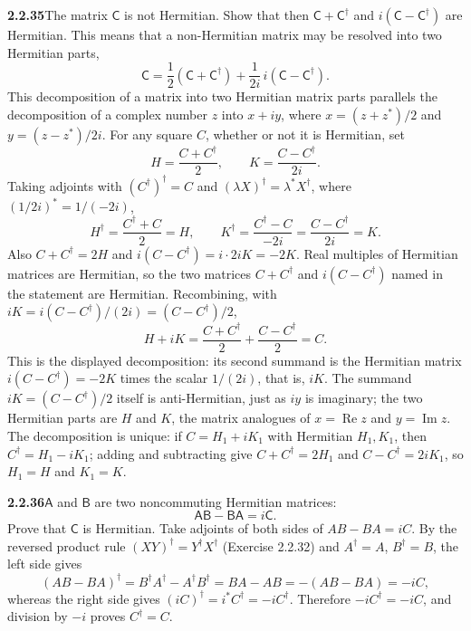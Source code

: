 \par\bigskip
\noindent\textbf{2.2.35}\quad The matrix $\mathsf{C}$ is not Hermitian. Show
that then $\mathsf{C}+\mathsf{C}^{\dagger}$ and
$i(\mathsf{C}-\mathsf{C}^{\dagger})$ are Hermitian. This means that a
non-Hermitian matrix may be resolved into two Hermitian parts,
\[
\mathsf{C}=\frac{1}{2}(\mathsf{C}+\mathsf{C}^{\dagger})
+\frac{1}{2i}\,i(\mathsf{C}-\mathsf{C}^{\dagger}).
\]
This decomposition of a matrix into two Hermitian matrix parts parallels the
decomposition of a complex number $z$ into $x+iy$, where $x=(z+z^{*})/2$ and
$y=(z-z^{*})/2i$.
\solution
For any square $C$, whether or not it is Hermitian, set
\[
H=\frac{C+C^\dagger}{2},\qquad K=\frac{C-C^\dagger}{2i}.
\]
Taking adjoints with $(C^\dagger)^\dagger=C$ and
$(\lambda X)^\dagger=\lambda^*X^\dagger$, where $(1/2i)^*=1/(-2i)$,
\[
H^\dagger=\frac{C^\dagger+C}{2}=H,\qquad
K^\dagger=\frac{C^\dagger-C}{-2i}
=\frac{C-C^\dagger}{2i}=K.
\]
Also $C+C^\dagger=2H$ and $i(C-C^\dagger)=i\cdot2iK=-2K$. Real
multiples of Hermitian matrices are Hermitian, so the two matrices
$C+C^\dagger$ and $i(C-C^\dagger)$ named in the statement are Hermitian.
Recombining, with $iK=i(C-C^\dagger)/(2i)=(C-C^\dagger)/2$,
\[
H+iK=\frac{C+C^\dagger}{2}+\frac{C-C^\dagger}{2}=C.
\]
This is the displayed decomposition: its second summand is the
Hermitian matrix $i(C-C^\dagger)=-2K$ times the scalar $1/(2i)$, that
is, $iK$. The summand $iK=(C-C^\dagger)/2$ itself is anti-Hermitian,
just as $iy$ is imaginary; the two Hermitian parts are $H$ and $K$,
the matrix analogues of $x=\operatorname{Re}z$ and
$y=\operatorname{Im}z$.
The decomposition is unique: if $C=H_1+iK_1$ with Hermitian
$H_1,K_1$, then $C^\dagger=H_1-iK_1$; adding and subtracting give
$C+C^\dagger=2H_1$ and $C-C^\dagger=2iK_1$, so $H_1=H$ and $K_1=K$.

\par\bigskip
\noindent\textbf{2.2.36}\quad $\mathsf{A}$ and $\mathsf{B}$ are two
noncommuting Hermitian matrices:
\[
\mathsf{AB}-\mathsf{BA}=i\mathsf{C}.
\]
Prove that $\mathsf{C}$ is Hermitian.
\solution
Take adjoints of both sides of $AB-BA=iC$. By the reversed product
rule $(XY)^\dagger=Y^\dagger X^\dagger$ (Exercise 2.2.32) and
$A^\dagger=A$, $B^\dagger=B$, the left side gives
\[
(AB-BA)^\dagger=B^\dagger A^\dagger-A^\dagger B^\dagger
=BA-AB=-(AB-BA)=-iC,
\]
whereas the right side gives $(iC)^\dagger=i^*C^\dagger=-iC^\dagger$.
Therefore $-iC^\dagger=-iC$, and division by $-i$ proves
$\boxed{C^\dagger=C}$.

